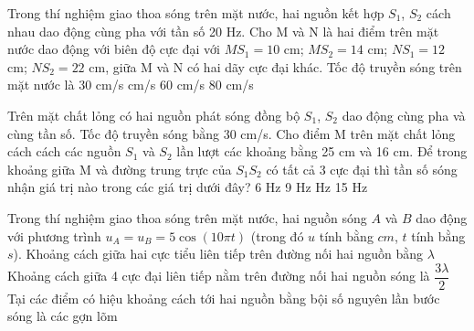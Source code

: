 \begin{ex}%
Trong thí nghiệm giao thoa sóng trên mặt nước, hai nguồn kết hợp $S_1$, $S_2$ cách nhau dao động cùng pha với tần số 20 Hz. Cho M và N là hai điểm trên mặt nước dao động với biên độ cực đại với $MS_1 = 10$ cm; $MS_2 = 14$ cm; $NS_1 = 12$ cm; $NS_2 = 22$ cm, giữa M và N có hai dãy cực đại khác. Tốc độ truyền sóng trên mặt nước là
\choice
{30 cm/s}
{ cm/s}
{60 cm/s}
{80 cm/s}
\end{ex} 
\begin{ex}%
Trên mặt chất lỏng có hai nguồn phát sóng đồng bộ $S_1$, $S_2$ dao động cùng pha và cùng tần số. Tốc độ truyền sóng bằng 30 cm/s. Cho điểm M trên mặt chất lỏng cách cách các nguồn $S_1$ và $S_2$ lần lượt các khoảng bằng 25 cm và 16 cm. Để trong khoảng giữa M và đường trung trực của $S_1S_2$ có tất cả 3 cực đại thì tần số sóng nhận giá trị nào trong các giá trị dưới đây?
\choice
{6 Hz}
{9 Hz}
{ Hz}
{15 Hz}
\end{ex} 
\PhanII
\setcounter{ex}{0}
\begin{ex}
Trong thí nghiệm giao thoa sóng trên mặt nước, hai nguồn sóng $A$ và $B$ dao động với phương trình $u_A=u_B=5\cos(10\pi t)$ (trong đó $u$ tính bằng $cm$, $t$ tính bằng $s$).
{Khoảng cách giữa hai cực tiểu liên tiếp trên đường nối hai nguồn bằng $\lambda$}
{\True Khoảng cách giữa 4 cực đại liên tiếp nằm trên đường nối hai nguồn sóng là $\dfrac{3\lambda}{2}$}
{Tại các điểm có hiệu khoảng cách tới hai nguồn bằng bội số nguyên lần bước sóng là các gợn lõm}
\end{ex}
